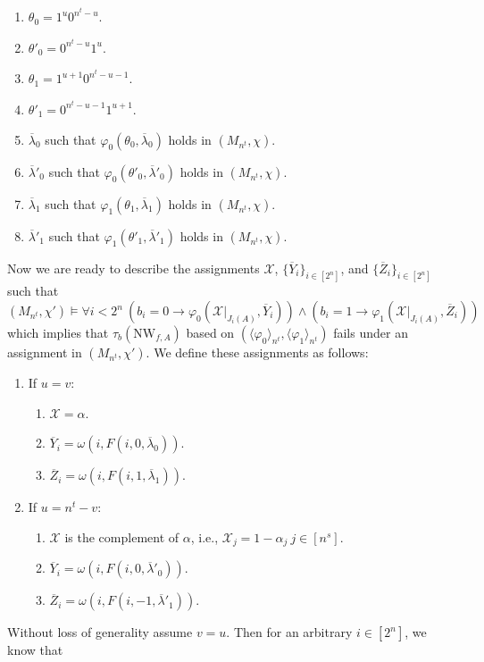 \documentclass[10pt,a4paper]{article}
\begin{document}
\begin{enumerate}
\item $\theta_0=1^u0^{n^t-u}$.
\item $\theta'_0=0^{n^t-u}1^u$.
\item $\theta_1=1^{u+1}0^{n^t-u-1}$.
\item $\theta'_1=0^{n^t-u-1}1^{u+1}$.
\item $\overline\lambda_0$ such that $\varphi_0(\theta_0,\overline\lambda_0)$ holds in $(M_{n^t},\chi)$.
\item $\overline\lambda'_0$ such that $\varphi_0(\theta'_0,\overline\lambda'_0)$ holds in $(M_{n^t},\chi)$.
\item $\overline\lambda_1$ such that $\varphi_1(\theta_1,\overline\lambda_1)$ holds in $(M_{n^t},\chi)$.
\item $\overline\lambda'_1$ such that $\varphi_1(\theta'_1,\overline\lambda'_1)$ holds in $(M_{n^t},\chi)$.
\end{enumerate}
Now we are ready to describe the assignments $\mathcal X$, $\{\overline Y_i\}_{i\in[2^n]}$, and $\{\overline Z_i\}_{i\in[2^n]}$ such that
\[(M_{n^t},\chi')\models\forall i<2^n\ (b_i=0\to\varphi_0(\mathcal X|_{J_i(A)},\overline Y_i))\wedge(b_i=1\to\varphi_1(\mathcal X|_{J_i(A)},\overline Z_i))\]
which implies that $\tau_b(\mathrm{NW}_{f,A})$ based on $(\langle\varphi_0\rangle_{n^t},\langle\varphi_1\rangle_{n^t})$ fails under an assignment in $(M_{n^t},\chi')$. We define these assignments as follows:
\begin{enumerate}
\item If $u=v$:
\begin{enumerate}
\item $\mathcal X=\alpha$.
\item $\overline Y_i=\omega(i,F(i,0,\overline\lambda_0))$.
\item $\overline Z_i=\omega(i,F(i,1,\overline\lambda_1))$.
\end{enumerate}
\item If $u=n^t-v$:
\begin{enumerate}
\item $\mathcal X$ is the complement of $\alpha$, i.e., $\mathcal X_j=1-\alpha_j\ j\in[n^s]$.
\item $\overline Y_i=\omega(i,F(i,0,\overline\lambda'_0))$.
\item $\overline Z_i=\omega(i,F(i,-1,\overline\lambda'_1))$.
\end{enumerate}
\end{enumerate}
Without loss of generality assume $v=u$. Then for an arbitrary $i\in[2^n]$, we know that
\end{document}
